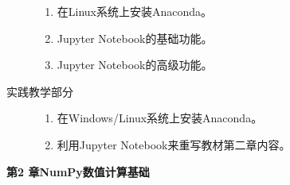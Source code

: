 \documentclass[12pt,a4paper,openany,cap]{ctexbook}
\begin{document}
\begin{description}
\begin{minipage}[t]{0.8\linewidth}
\begin{enumerate}
\item\label{item:66}  在Linux系统上安装Anaconda。
\item\label{item:67}  Jupyter Notebook的基础功能。
\item\label{item:68}  Jupyter Notebook的高级功能。
    \end{enumerate}
  \end{minipage}
\item[实践教学部分]
  \begin{minipage}[t]{0.8\linewidth}
    \begin{enumerate}
    \item      在Windows/Linux系统上安装Anaconda。
\item\label{item:69}  利用Jupyter Notebook来重写教材第二章内容。
    \end{enumerate}
  \end{minipage}
\end{description}
\begin{center}
   \textbf{第2 章\quad NumPy数值计算基础}
\end{center}
\end{document}
